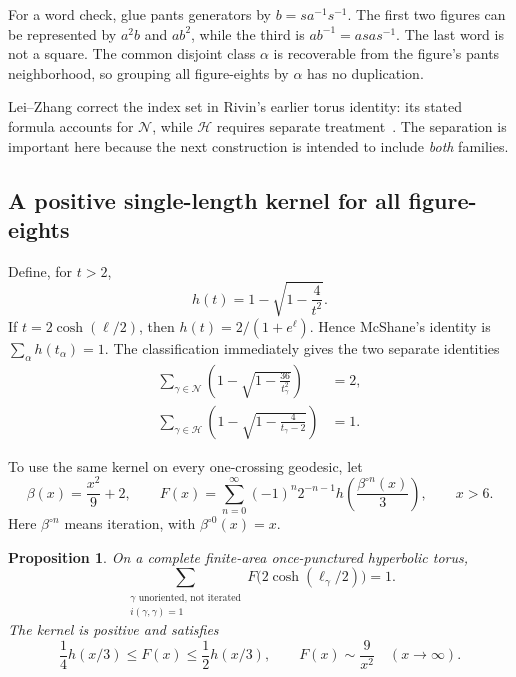 \documentclass[11pt,a4paper]{article}
\numberwithin{equation}{section}
\newtheorem{proposition}[theorem]{Proposition}
\theoremstyle{definition}
\theoremstyle{remark}
\begin{document}
For a word check, glue pants generators by $b=s a^{-1}s^{-1}$. The first
two figures can be represented by $a^2b$ and $ab^2$, while the third is
$ab^{-1}=asa s^{-1}$. The last word is not a square. The common disjoint
class $\alpha$ is recoverable from the figure's pants neighborhood, so
grouping all figure-eights by $\alpha$ has no duplication.

Lei--Zhang correct the index set in Rivin's earlier torus identity: its
stated formula accounts for $\mathcal N$, while $\mathcal H$ requires
separate treatment~\cite{LeiZhang}. The separation is important here
because the next construction is intended to include \emph{both} families.

\subsection{A positive single-length kernel for all figure-eights}

Define, for $t>2$,
\begin{equation}
 h(t)=1-\sqrt{1-\frac4{t^2}}.
 \label{eq:htrace}
\end{equation}
If $t=2\cosh(\ell/2)$, then $h(t)=2/(1+e^\ell)$. Hence McShane's
identity is $\sum_\alpha h(t_\alpha)=1$. The classification immediately
gives the two separate identities
\begin{align}
 \sum_{\gamma\in\mathcal N}
       \left(1-\sqrt{1-\frac{36}{t_\gamma^2}}\right)&=2,
       \label{eq:nidentity}\\
 \sum_{\gamma\in\mathcal H}
       \left(1-\sqrt{1-\frac4{t_\gamma-2}}\right)&=1.
       \label{eq:hidentity}
\end{align}

To use the same kernel on every one-crossing geodesic, let
\begin{equation}
 \beta(x)=\frac{x^2}{9}+2,\qquad
 F(x)=\sum_{n=0}^{\infty}(-1)^n2^{-n-1}
             h\left(\frac{\beta^{\circ n}(x)}3\right),\qquad x>6.
 \label{eq:universalkernel}
\end{equation}
Here $\beta^{\circ n}$ means iteration, with $\beta^{\circ0}(x)=x$.

\begin{proposition}
On a complete finite-area once-punctured hyperbolic torus,
\begin{equation}
 \boxed{\sum_{\substack{\gamma\text{ unoriented, not iterated}\\
                       i(\gamma,\gamma)=1}}
        F\bigl(2\cosh(\ell_\gamma/2)\bigr)=1.}
 \label{eq:allfigureidentity}
\end{equation}
The kernel is positive and satisfies
\begin{equation}
 \frac14h(x/3)\le F(x)\le\frac12h(x/3),
 \qquad F(x)\sim\frac9{x^2}\quad(x\longrightarrow\infty).
 \label{eq:fbound}
\end{equation}
\end{proposition}
\end{document}
